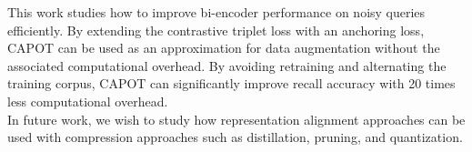 This work studies how to improve bi-encoder performance on noisy queries efficiently. By extending the contrastive triplet loss with an anchoring loss, CAPOT can be used as an approximation for data augmentation without the associated computational overhead. By avoiding retraining and alternating the training corpus, CAPOT can significantly improve recall accuracy with 20 times less computational overhead.  \\ 
In future work, we wish to study how representation alignment approaches can be used with compression approaches such as distillation, pruning, and quantization.